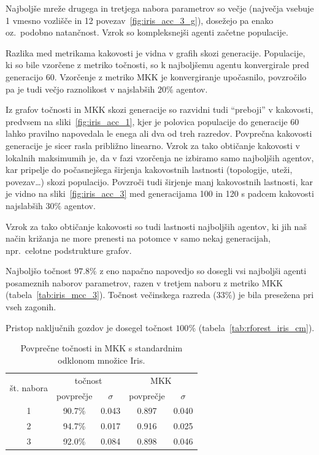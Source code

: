 \documentclass[a4paper,12pt,openright]{book}
\begin{document}
    Najboljše mreže drugega in tretjega nabora parametrov so večje (največja vsebuje 1 vmesno vozlišče in 12 povezav~\ref{fig:iris_acc_3_g}),
    dosežejo pa enako oz.\ podobno natančnost.
    Vzrok so kompleksnejši agenti začetne populacije.

    Razlika med metrikama kakovosti je vidna v grafih skozi generacije.
    Populacije, ki so bile vzorčene z metriko točnosti, so k najboljšemu agentu konvergirale pred generacijo 60.
    Vzorčenje z metriko MKK je konvergiranje upočasnilo, povzročilo pa je tudi večjo raznolikost v najslabših $20\%$ agentov.

    Iz grafov točnosti in MKK skozi generacije so razvidni tudi \enquote{preboji} v kakovosti, predvsem na sliki~\ref{fig:iris_acc_1},
    kjer je polovica populacije do generacije 60 lahko pravilno napovedala le enega ali dva od treh razredov.
    Povprečna kakovosti generacije je sicer rasla približno linearno.
    Vzrok za tako obtičanje kakovosti v lokalnih maksimumih je, da v fazi vzorčenja ne izbiramo samo najboljših agentov,
    kar pripelje do počasnejšega širjenja kakovostnih lastnosti (topologije, uteži, povezav\ldots) skozi populacijo.
    Povzroči tudi širjenje manj kakovostnih lastnosti, kar je vidno na sliki~\ref{fig:iris_acc_3} med generacijama 100 in
    120 s padcem kakovosti najslabših $30\%$ agentov.

    Vzrok za tako obtičanje kakovosti so tudi lastnosti najboljših agentov, ki jih naš način križanja ne more prenesti
    na potomce v samo nekaj generacijah, npr.\ celotne podstrukture grafov.

    Najboljšo točnost $97.8\%$ z eno napačno napovedjo so dosegli vsi najboljši agenti posameznih naborov parametrov, razen v tretjem naboru z
    metriko MKK (tabela~\ref{tab:iris_mcc_3}).
    Točnost večinskega razreda ($33\%$) je bila presežena pri vseh zagonih.

    Pristop naključnih gozdov je dosegel točnost $100\%$ (tabela~\ref{tab:rforest_iris_cm}).

    \begin{table}[H]
        \begin{center}
            \begin{tabular}{|| c | c c || c c ||}
                \hline
                \multirow{2}{*}{št. nabora} & \multicolumn{2}{c||}{točnost} & \multicolumn{2}{c||}{MKK} \\ \cline{2-5}
                & povprečje & $\sigma$ & povprečje & $\sigma$ \\
                \hline
                1 & 90.7\%    & 0.043    & 0.897     & 0.040    \\
                2 & 94.7\%    & 0.017    & 0.916     & 0.025    \\
                3 & 92.0\%    & 0.084    & 0.898     & 0.046    \\
                \hline
            \end{tabular}
        \end{center}
        \caption{Povprečne točnosti in MKK s standardnim odklonom množice Iris.}
        \label{tab:iris_result_aggregate}
    \end{table}
\end{document}
